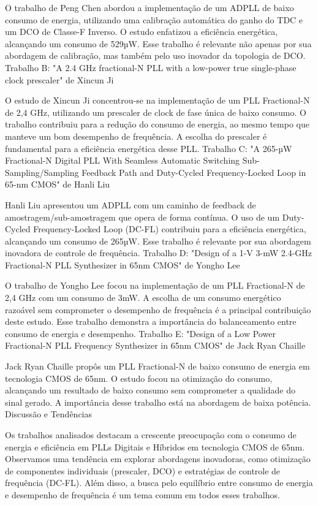 O trabalho de Peng Chen abordou a implementação de um ADPLL de baixo consumo de energia, utilizando uma calibração automática do ganho do TDC e um DCO de Classe-F Inverso. O estudo enfatizou a eficiência energética, alcançando um consumo de 529µW. Esse trabalho é relevante não apenas por sua abordagem de calibração, mas também pelo uso inovador da topologia de DCO.
Trabalho B: "A 2.4 GHz fractional-N PLL with a low-power true single-phase clock prescaler" de Xincun Ji

O estudo de Xincun Ji concentrou-se na implementação de um PLL Fractional-N de 2,4 GHz, utilizando um prescaler de clock de fase única de baixo consumo. O trabalho contribuiu para a redução do consumo de energia, ao mesmo tempo que manteve um bom desempenho de frequência. A escolha do prescaler é fundamental para a eficiência energética desse PLL.
Trabalho C: "A 265-µW Fractional-N Digital PLL With Seamless Automatic Switching Sub-Sampling/Sampling Feedback Path and Duty-Cycled Frequency-Locked Loop in 65-nm CMOS" de Hanli Liu

Hanli Liu apresentou um ADPLL com um caminho de feedback de amostragem/sub-amostragem que opera de forma contínua. O uso de um Duty-Cycled Frequency-Locked Loop (DC-FL) contribuiu para a eficiência energética, alcançando um consumo de 265µW. Esse trabalho é relevante por sua abordagem inovadora de controle de frequência.
Trabalho D: "Design of a 1-V 3-mW 2.4-GHz Fractional-N PLL Synthesizer in 65nm CMOS" de Yongho Lee

O trabalho de Yongho Lee focou na implementação de um PLL Fractional-N de 2,4 GHz com um consumo de 3mW. A escolha de um consumo energético razoável sem comprometer o desempenho de frequência é a principal contribuição deste estudo. Esse trabalho demonstra a importância do balanceamento entre consumo de energia e desempenho.
Trabalho E: "Design of a Low Power Fractional-N PLL Frequency Synthesizer in 65nm CMOS" de Jack Ryan Chaille

Jack Ryan Chaille propôs um PLL Fractional-N de baixo consumo de energia em tecnologia CMOS de 65nm. O estudo focou na otimização do consumo, alcançando um resultado de baixo consumo sem comprometer a qualidade do sinal gerado. A importância desse trabalho está na abordagem de baixa potência.
Discussão e Tendências

Os trabalhos analisados destacam a crescente preocupação com o consumo de energia e eficiência em PLLs Digitais e Híbridos em tecnologia CMOS de 65nm. Observamos uma tendência em explorar abordagens inovadoras, como otimização de componentes individuais (prescaler, DCO) e estratégias de controle de frequência (DC-FL). Além disso, a busca pelo equilíbrio entre consumo de energia e desempenho de frequência é um tema comum em todos esses trabalhos.

